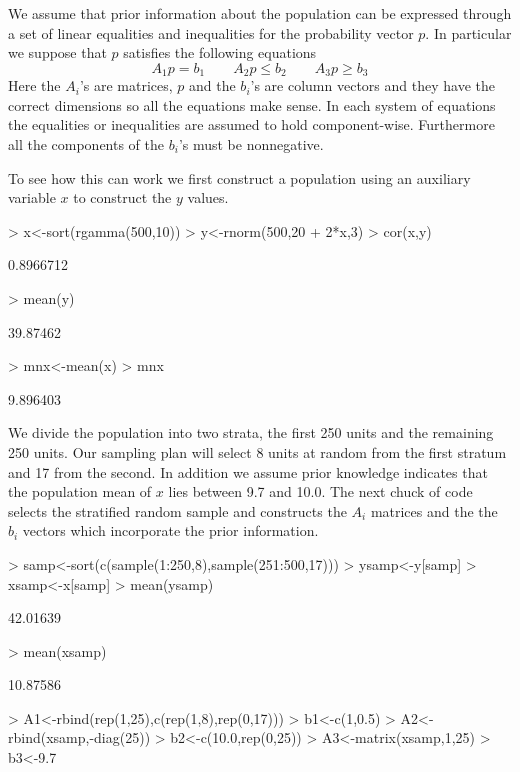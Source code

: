 \documentclass{article}
\begin{document}
We assume that prior information about the population  can be 
expressed through a set of linear equalities and inequalities
for the probability vector $p$. In particular we suppose 
that $p$ satisfies the following equations
\[
A_1 p = b_1 \quad \quad A_2 p \leq  b_2 \quad \quad A_3 p \geq b_3
\]
Here the $A_i$'s are matrices, $p$ and the $b_i$'s are column 
vectors and they have the correct dimensions so all the equations
make sense. In each system of equations the equalities or 
inequalities are assumed to hold component-wise. Furthermore all
the components of the $b_i$'s must be nonnegative.


To see how this can work 
we first construct a population using an auxiliary
variable $x$ to construct the $y$ values. 

\begin{Schunk}
\begin{Sinput}
> x<-sort(rgamma(500,10))
> y<-rnorm(500,20 + 2*x,3)
> cor(x,y)
\end{Sinput}
\begin{Soutput}
[1] 0.8966712
\end{Soutput}
\begin{Sinput}
> mean(y)
\end{Sinput}
\begin{Soutput}
[1] 39.87462
\end{Soutput}
\begin{Sinput}
> mnx<-mean(x)
> mnx
\end{Sinput}
\begin{Soutput}
[1] 9.896403
\end{Soutput}
\end{Schunk}


We divide the population into two strata, the first 250 units 
and the remaining 250 units. Our sampling plan will select 8 
units at random from the first stratum and 17 from the second.
In addition we assume prior knowledge indicates that 
the population mean of $x$ lies between 9.7 and 10.0.
The next chuck of code selects the stratified random 
sample and constructs the $A_i$ matrices and the the $b_i$
vectors which incorporate the prior information.

\begin{Schunk}
\begin{Sinput}
> samp<-sort(c(sample(1:250,8),sample(251:500,17)))
> ysamp<-y[samp]
> xsamp<-x[samp]
> mean(ysamp)
\end{Sinput}
\begin{Soutput}
[1] 42.01639
\end{Soutput}
\begin{Sinput}
> mean(xsamp)
\end{Sinput}
\begin{Soutput}
[1] 10.87586
\end{Soutput}
\begin{Sinput}
> A1<-rbind(rep(1,25),c(rep(1,8),rep(0,17)))
> b1<-c(1,0.5)
> A2<-rbind(xsamp,-diag(25))
> b2<-c(10.0,rep(0,25))
> A3<-matrix(xsamp,1,25)
> b3<-9.7
\end{Sinput}
\end{Schunk}
\end{document}
